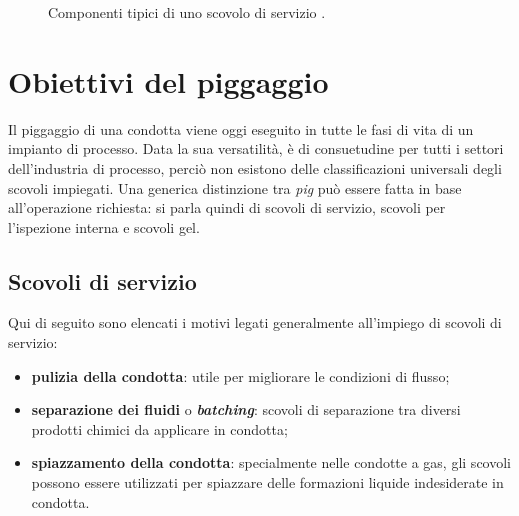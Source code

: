\begin{figure}[htbp]
     \qquad
\caption{Componenti tipici di uno scovolo di servizio \parencite{williamson2015guide}.}
\label{fig:dispositivi}
\end{figure}

\section{Obiettivi del piggaggio}
Il piggaggio di una condotta viene oggi eseguito in tutte le fasi di vita di un impianto di processo. Data la sua versatilità, è di consuetudine per tutti i settori dell'industria di processo, perciò non esistono delle classificazioni universali degli scovoli impiegati. Una generica distinzione tra \textit{pig} può essere fatta in base all'operazione richiesta: si parla quindi di scovoli di servizio, scovoli per l'ispezione interna e scovoli gel.

\subsection{Scovoli di servizio}
Qui di seguito sono elencati i motivi legati generalmente all'impiego di scovoli di servizio:
\begin{itemize}
	\item \textbf{pulizia della condotta}: utile per migliorare le condizioni di flusso;
	\item \textbf{separazione dei fluidi} o \textit{\textbf{batching}}: scovoli di separazione tra diversi prodotti chimici da applicare in condotta;
	\item \textbf{spiazzamento della condotta}: specialmente nelle condotte a gas, gli scovoli possono essere utilizzati per spiazzare delle formazioni liquide indesiderate in condotta.
\end{itemize}

